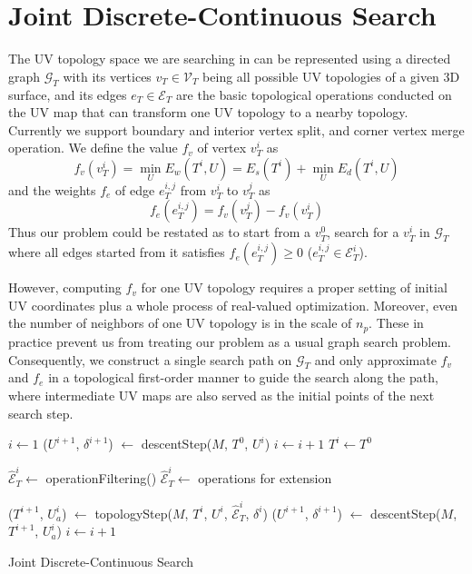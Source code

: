 
\section{Joint Discrete-Continuous Search}
\label{sec:DCSearch}

The UV topology space we are searching in can be represented using a directed graph $\mathcal{G}_T$ with its vertices $v_T \in \mathcal{V}_T$ being all possible UV topologies of a given 3D surface, and its edges $e_T \in \mathcal{E}_T$ are the basic topological operations conducted on the UV map that can transform one UV topology to a nearby topology. Currently we support boundary and interior vertex split, and corner vertex merge operation.
We define the value $f_v$ of vertex $v^i_T$ as 
\[ f_v(v^i_T) = \min_{U} E_w(T^i, U) = E_s(T^i) + \min_{U} E_d(T^i, U) \]
and the weights $f_e$ of edge $e^{i,j}_{T}$ from $v^i_T$ to $v^j_T$ as 
\[ f_e(e^{i,j}_T) = f_v(v^j_T) - f_v(v^i_T) \]
Thus our problem could be restated as to start from a $v^0_T$, search for a $v^i_T$ in $\mathcal{G}_T$ where all edges started from it satisfies $f_e(e^{i,j}_T) \geq 0$ ($e^{i,j}_T \in \mathcal{E}^i_T$).

However, computing $f_v$ for one UV topology requires a proper setting of initial UV coordinates plus a whole process of real-valued optimization. Moreover, even the number of neighbors of one UV topology is in the scale of $n_p$. These in practice prevent us from treating our problem as a usual graph search problem. Consequently, we construct a single search path on $\mathcal{G}_T$ and only approximate $f_v$ and $f_e$ in a topological first-order manner to guide the search along the path, where intermediate UV maps are also served as the initial points of the next search step.

\begin{algorithm}[h]
\SetAlgoLined
{}
$i \leftarrow 1$\;
{
	($U^{i+1}$, $\delta^{i+1}$) $\leftarrow$ descentStep($M$, $T^0$, $U^i$)\;
	$i \leftarrow i+1$\;
}
$T^i \leftarrow T^0$\;
{
	{
		$\hat{\mathcal{E}}^i_T \leftarrow$ operationFiltering()\;
	}
	{
		$\hat{\mathcal{E}}^i_T \leftarrow$ operations for extension\;
	}

	($T^{i+1}$, $U_a^{i}$) $\leftarrow$ topologyStep($M$, $T^i$, $U^i$, $\hat{\mathcal{E}}^i_T$, $\delta^i$)\;
	($U^{i+1}$, $\delta^{i+1}$) $\leftarrow$ descentStep($M$, $T^{i+1}$, $U_a^i$)\;
	$i \leftarrow i+1$\;
}
\caption{Joint Discrete-Continuous Search}
\label{alg:DCSearch}
\end{algorithm}

